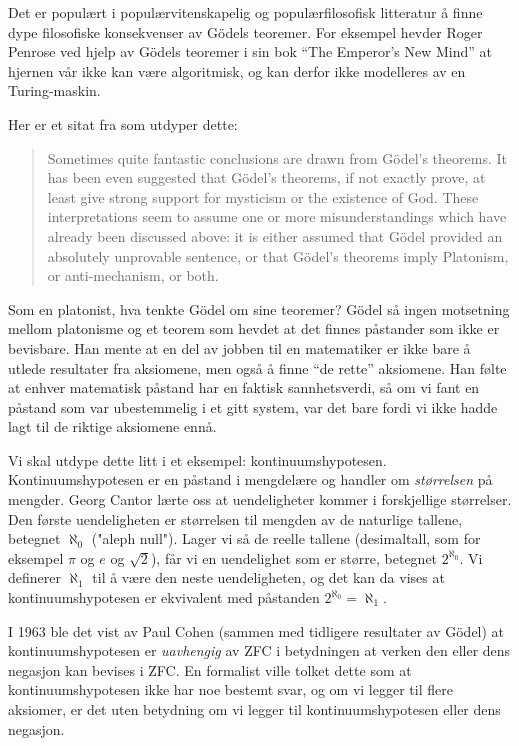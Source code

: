 \documentclass[12pt, norsk]{article}
\begin{document}
Det er populært i populærvitenskapelig og populærfilosofisk litteratur å finne dype filosofiske konsekvenser av Gödels teoremer. For eksempel hevder Roger Penrose ved hjelp av Gödels teoremer i sin bok ``The Emperor's New Mind'' \cite{penrose_emperor} at hjernen vår ikke kan være algoritmisk, og kan derfor ikke modelleres av en Turing-maskin.

Her er et sitat fra \cite{godel_online} som utdyper dette:
\begin{quote}
Sometimes quite fantastic conclusions are drawn from Gödel's theorems. It has been even suggested that Gödel's theorems, if not exactly prove, at least give strong support for mysticism or the existence of God. These interpretations seem to assume one or more misunderstandings which have already been discussed above: it is either assumed that Gödel provided an absolutely unprovable sentence, or that Gödel's theorems imply Platonism, or anti-mechanism, or both.
\end{quote}

Som en platonist, hva tenkte Gödel om sine teoremer? Gödel så ingen motsetning mellom platonisme og et teorem som hevdet at det finnes påstander som ikke er bevisbare. Han mente at en del av jobben til en matematiker er ikke bare å utlede resultater fra aksiomene, men også å finne ``de rette'' aksiomene. Han følte at enhver matematisk påstand har en faktisk sannhetsverdi, så om vi fant en påstand som var ubestemmelig i et gitt system, var det bare fordi vi ikke hadde lagt til de riktige aksiomene ennå.

Vi skal utdype dette litt i et eksempel: kontinuumshypotesen. Kontinuumshypotesen er en påstand i mengdelære og handler om \emph{størrelsen} på mengder. Georg Cantor lærte oss at uendeligheter kommer i forskjellige størrelser. Den første uendeligheten er størrelsen til mengden av de naturlige tallene, betegnet $\aleph_0$ ("aleph null"). Lager vi så de reelle tallene (desimaltall, som for eksempel $\pi$ og $e$ og $\sqrt 2$), får vi en uendelighet som er større, betegnet $2^{\aleph_0}$. Vi definerer $\aleph_1$ til å være den neste uendeligheten, og det kan da vises at kontinuumshypotesen er ekvivalent med påstanden $2^{\aleph_0}=\aleph_1$. 

I 1963 ble det vist av Paul Cohen (sammen med tidligere resultater av Gödel) at kontinuumshypotesen er \emph{uavhengig} av ZFC i betydningen at verken den eller dens negasjon kan bevises i ZFC. En formalist ville tolket dette som at kontinuumshypotesen ikke har noe bestemt svar, og om vi legger til flere aksiomer, er det uten betydning om vi legger til kontinuumshypotesen eller dens negasjon.
\end{document}
